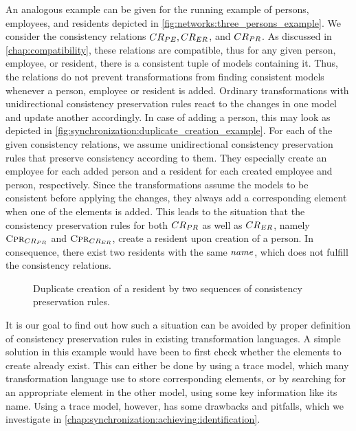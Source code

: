 An analogous example can be given for the running example of persons, employees, and residents depicted in \autoref{fig:networks:three_persons_example}.
We consider the consistency relations $\consistencyrelation{CR}{PE}, \consistencyrelation{CR}{ER}$, and $\consistencyrelation{CR}{PR}$.
As discussed in \autoref{chap:compatibility}, these relations are compatible, thus for any given person, employee, or resident, there is a consistent tuple of models containing it.
Thus, the relations do not prevent transformations from finding consistent models whenever a person, employee or resident is added.
Ordinary transformations with unidirectional consistency preservation rules react to the changes in one model and update another accordingly.
In case of adding a person, this may look as depicted in \autoref{fig:synchronization:duplicate_creation_example}.
For each of the given consistency relations, we assume unidirectional consistency preservation rules that preserve consistency according to them.
They especially create an employee for each added person and a resident for each created employee and person, respectively.
Since the transformations assume the models to be consistent before applying the changes, they always add a corresponding element when one of the elements is added.
This leads to the situation that the consistency preservation rules for both $\consistencyrelation{CR}{PR}$ as well as $\consistencyrelation{CR}{ER}$, namely $\consistencypreservationrule{\consistencyrelation{CR}{PR}}$ and $\consistencypreservationrule{\consistencyrelation{CR}{ER}}$, create a resident upon creation of a person.
In consequence, there exist two residents with the same $\mathit{name}$, which does not fulfill the consistency relations.

\begin{figure}
    \centering
    
    \caption[Duplicate creation of an element]{Duplicate creation of a resident by two sequences of consistency preservation rules.}
    \label{fig:synchronization:duplicate_creation_example}
\end{figure}

It is our goal to find out how such a situation can be avoided by proper definition of consistency preservation rules in existing transformation languages.
A simple solution in this example would have been to first check whether the elements to create already exist.
This can either be done by using a trace model, which many transformation language use to store corresponding elements, or by searching for an appropriate element in the other model, using some key information like its name.
Using a trace model, however, has some drawbacks and pitfalls, which we investigate in \autoref{chap:synchronization:achieving:identification}.


